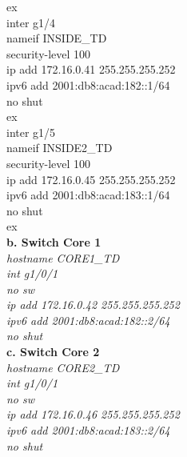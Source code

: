 \documentclass[a4paper, 12pt]{article}
\begin{document}
{\hspace*{2cm}ex\\
\hspace*{2cm}inter g1/4\\
\hspace*{2cm}nameif INSIDE\_TD\\
\hspace*{2cm}security-level 100\\
\hspace*{2cm}ip add 172.16.0.41 255.255.255.252\\
\hspace*{2cm}ipv6 add 2001:db8:acad:182::1/64\\
\hspace*{2cm}no shut \\
\hspace*{2cm}ex\\
\hspace*{2cm}inter g1/5\\
\hspace*{2cm}nameif INSIDE2\_TD\\
\hspace*{2cm}security-level 100\\
\hspace*{2cm}ip add 172.16.0.45 255.255.255.252\\
\hspace*{2cm}ipv6 add 2001:db8:acad:183::1/64\\
\hspace*{2cm}no shut\\
\hspace*{2cm}ex\\}
\hspace*{1cm}\textbf{b. Switch Core 1}\\
\hspace*{2cm}\textit{hostname CORE1\_TD\\
\hspace*{2cm}int g1/0/1\\
\hspace*{2cm}no sw\\
\hspace*{2cm}ip add 172.16.0.42 255.255.255.252\\
\hspace*{2cm}ipv6 add 2001:db8:acad:182::2/64\\
\hspace*{2cm}no shut\\}
\hspace*{1cm}\textbf{c. Switch Core 2}\\
\hspace*{2cm}\textit{hostname CORE2\_TD\\
\hspace*{2cm}int g1/0/1\\
\hspace*{2cm}no sw\\
\hspace*{2cm}ip add 172.16.0.46 255.255.255.252\\
\hspace*{2cm}ipv6 add 2001:db8:acad:183::2/64\\
\hspace*{2cm}no shut\\}
\end{document}
